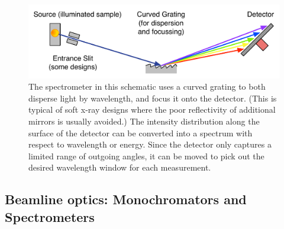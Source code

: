 \begin{figure}[htbp] %
   \centering
   \includegraphics[scale=0.6]{../data/Chapter1/1b_spectrometerSchematic/1b_rowlandSpectrometer.pdf} 
   \caption[The spectrometer in this schematic uses a curved grating to both disperse light by wavelength, and focus it onto the detector.]{The spectrometer in this schematic uses a curved grating to both disperse light by wavelength, and focus it onto the detector.  (This is typical of soft x-ray designs where the poor reflectivity of additional mirrors is usually avoided.)  The intensity distribution along the surface of the detector can be converted into a spectrum with respect to wavelength or energy.  Since the detector only captures a limited range of outgoing angles, it can be moved to pick out the desired wavelength window for each measurement.}
   \label{1b_rowlandSpectrometer}
\end{figure}





\subsection{Beamline optics: Monochromators and Spectrometers}
